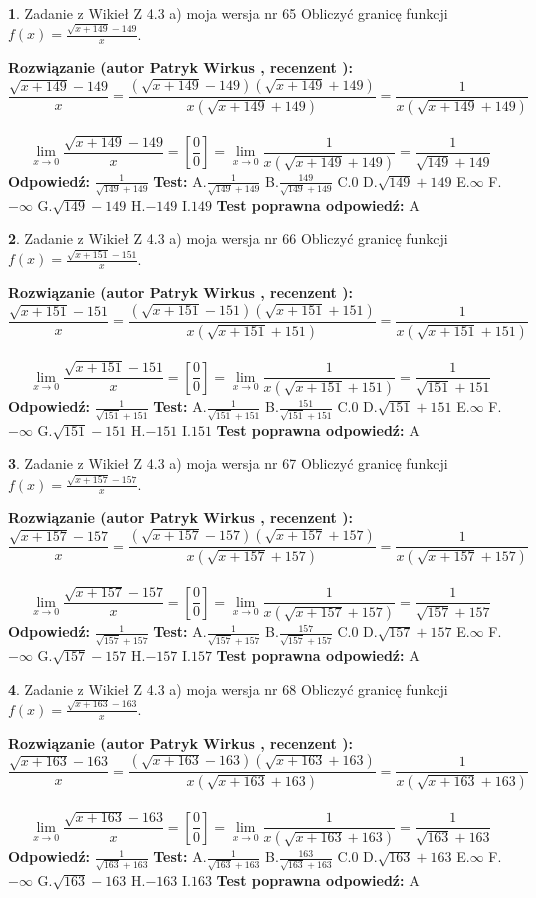 \documentclass[12pt, a4paper]{article}
\theoremstyle{definition} %
\newtheorem{zad}{}
\newcommand{\zadStart}[1]{\begin{zad}#1\newline}
\newcommand{\zadStop}{\end{zad}}
\newcommand{\rozwStart}[2]{\noindent \textbf{Rozwiązanie (autor #1 , recenzent #2): }\newline}
\newcommand{\rozwStop}{\newline}
\newcommand{\odpStart}{\noindent \textbf{Odpowiedź:}\newline}
\newcommand{\odpStop}{\newline}
\newcommand{\testStart}{\noindent \textbf{Test:}\newline}
\newcommand{\testStop}{\newline}
\newcommand{\kluczStart}{\noindent \textbf{Test poprawna odpowiedź:}\newline}
\newcommand{\kluczStop}{\newline}
\begin{document}
\zadStart{Zadanie z Wikieł Z 4.3 a) moja wersja nr 65}
Obliczyć granicę funkcji $f(x)=\frac{\sqrt{x+149}-149}{x}$.
\zadStop
\rozwStart{Patryk Wirkus}{}
$$\frac{\sqrt{x+149}-149}{x}=\frac{(\sqrt{x+149}-149)(\sqrt{x+149}+149)}{x(\sqrt{x+149}+149)}=\frac{1}{x(\sqrt{x+149}+149)}$$
\\
$$\lim\limits_{x\to0}\frac{\sqrt{x+149}-149}{x}=[\frac{0}{0}]=
\lim\limits_{x\to0}\frac{1}{x(\sqrt{x+149}+149)} = \frac{1}{\sqrt{149}+149}$$
\rozwStop
\odpStart
$\frac{1}{\sqrt{149}+149}$
\odpStop
\testStart
A.$\frac{1}{\sqrt{149}+149}$
B.$\frac{149}{\sqrt{149}+149}$
C.$0$
D.$\sqrt{149}+149$
E.$\infty$
F.$-\infty$
G.$\sqrt{149}-149$
H.$-149$
I.$149$
\testStop
\kluczStart
A
\kluczStop



\zadStart{Zadanie z Wikieł Z 4.3 a) moja wersja nr 66}
Obliczyć granicę funkcji $f(x)=\frac{\sqrt{x+151}-151}{x}$.
\zadStop
\rozwStart{Patryk Wirkus}{}
$$\frac{\sqrt{x+151}-151}{x}=\frac{(\sqrt{x+151}-151)(\sqrt{x+151}+151)}{x(\sqrt{x+151}+151)}=\frac{1}{x(\sqrt{x+151}+151)}$$
\\
$$\lim\limits_{x\to0}\frac{\sqrt{x+151}-151}{x}=[\frac{0}{0}]=
\lim\limits_{x\to0}\frac{1}{x(\sqrt{x+151}+151)} = \frac{1}{\sqrt{151}+151}$$
\rozwStop
\odpStart
$\frac{1}{\sqrt{151}+151}$
\odpStop
\testStart
A.$\frac{1}{\sqrt{151}+151}$
B.$\frac{151}{\sqrt{151}+151}$
C.$0$
D.$\sqrt{151}+151$
E.$\infty$
F.$-\infty$
G.$\sqrt{151}-151$
H.$-151$
I.$151$
\testStop
\kluczStart
A
\kluczStop



\zadStart{Zadanie z Wikieł Z 4.3 a) moja wersja nr 67}
Obliczyć granicę funkcji $f(x)=\frac{\sqrt{x+157}-157}{x}$.
\zadStop
\rozwStart{Patryk Wirkus}{}
$$\frac{\sqrt{x+157}-157}{x}=\frac{(\sqrt{x+157}-157)(\sqrt{x+157}+157)}{x(\sqrt{x+157}+157)}=\frac{1}{x(\sqrt{x+157}+157)}$$
\\
$$\lim\limits_{x\to0}\frac{\sqrt{x+157}-157}{x}=[\frac{0}{0}]=
\lim\limits_{x\to0}\frac{1}{x(\sqrt{x+157}+157)} = \frac{1}{\sqrt{157}+157}$$
\rozwStop
\odpStart
$\frac{1}{\sqrt{157}+157}$
\odpStop
\testStart
A.$\frac{1}{\sqrt{157}+157}$
B.$\frac{157}{\sqrt{157}+157}$
C.$0$
D.$\sqrt{157}+157$
E.$\infty$
F.$-\infty$
G.$\sqrt{157}-157$
H.$-157$
I.$157$
\testStop
\kluczStart
A
\kluczStop



\zadStart{Zadanie z Wikieł Z 4.3 a) moja wersja nr 68}
Obliczyć granicę funkcji $f(x)=\frac{\sqrt{x+163}-163}{x}$.
\zadStop
\rozwStart{Patryk Wirkus}{}
$$\frac{\sqrt{x+163}-163}{x}=\frac{(\sqrt{x+163}-163)(\sqrt{x+163}+163)}{x(\sqrt{x+163}+163)}=\frac{1}{x(\sqrt{x+163}+163)}$$
\\
$$\lim\limits_{x\to0}\frac{\sqrt{x+163}-163}{x}=[\frac{0}{0}]=
\lim\limits_{x\to0}\frac{1}{x(\sqrt{x+163}+163)} = \frac{1}{\sqrt{163}+163}$$
\rozwStop
\odpStart
$\frac{1}{\sqrt{163}+163}$
\odpStop
\testStart
A.$\frac{1}{\sqrt{163}+163}$
B.$\frac{163}{\sqrt{163}+163}$
C.$0$
D.$\sqrt{163}+163$
E.$\infty$
F.$-\infty$
G.$\sqrt{163}-163$
H.$-163$
I.$163$
\testStop
\kluczStart
A
\kluczStop
\end{document}

